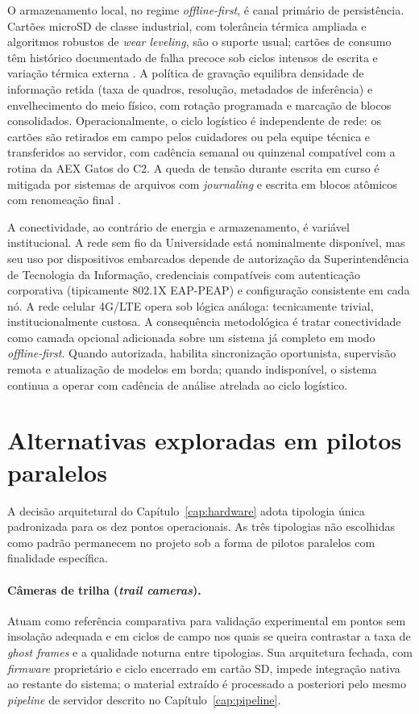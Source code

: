O armazenamento local, no regime \textit{offline-first}, é canal primário de persistência. Cartões microSD de classe industrial, com tolerância térmica ampliada e algoritmos robustos de \textit{wear leveling}, são o suporte usual; cartões de consumo têm histórico documentado de falha precoce sob ciclos intensos de escrita e variação térmica externa \cite{tiddeman2023lowpowerhardware,sargent2021raspberrypi}. A política de gravação equilibra densidade de informação retida (taxa de quadros, resolução, metadados de inferência) e envelhecimento do meio físico, com rotação programada e marcação de blocos consolidados. Operacionalmente, o ciclo logístico é independente de rede: os cartões são retirados em campo pelos cuidadores ou pela equipe técnica e transferidos ao servidor, com cadência semanal ou quinzenal compatível com a rotina da AEX Gatos do C2. A queda de tensão durante escrita em curso é mitigada por sistemas de arquivos com \textit{journaling} e escrita em blocos atômicos com renomeação final \cite{sargent2021raspberrypi}.


A conectividade, ao contrário de energia e armazenamento, é variável institucional. A rede sem fio da Universidade está nominalmente disponível, mas seu uso por dispositivos embarcados depende de autorização da Superintendência de Tecnologia da Informação, credenciais compatíveis com autenticação corporativa (tipicamente 802.1X EAP-PEAP) e configuração consistente em cada nó. A rede celular 4G/LTE opera sob lógica análoga: tecnicamente trivial, institucionalmente custosa. A consequência metodológica é tratar conectividade como camada opcional adicionada sobre um sistema já completo em modo \textit{offline-first}. Quando autorizada, habilita sincronização oportunista, supervisão remota e atualização de modelos em borda; quando indisponível, o sistema continua a operar com cadência de análise atrelada ao ciclo logístico.


\section{Alternativas exploradas em pilotos paralelos}
\label{sec:ap-hw-alternativas}


A decisão arquitetural do Capítulo~\ref{cap:hardware} adota tipologia única padronizada para os dez pontos operacionais. As três tipologias não escolhidas como padrão permanecem no projeto sob a forma de pilotos paralelos com finalidade específica.


\paragraph*{Câmeras de trilha (\textit{trail cameras}).}
Atuam como referência comparativa para validação experimental em pontos sem insolação adequada e em ciclos de campo nos quais se queira contrastar a taxa de \textit{ghost frames} e a qualidade noturna entre tipologias. Sua arquitetura fechada, com \textit{firmware} proprietário e ciclo encerrado em cartão SD, impede integração nativa ao restante do sistema; o material extraído é processado a posteriori pelo mesmo \textit{pipeline} de servidor descrito no Capítulo~\ref{cap:pipeline}.


